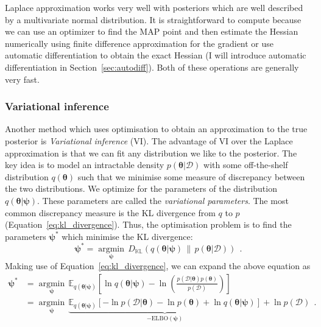 \documentclass[12pt,dvipsnames]{report}
\renewcommand{\vec}[1]{\boldsymbol{\mathbf{#1}}}
\newcommand{\hquad}{~~}
\begin{document}
Laplace approximation works very well with posteriors which are well described
by a multivariate normal distribution. It is straightforward to compute because
we can use an optimizer to find the MAP point and then estimate the Hessian
numerically using finite difference approximation for the gradient or use
automatic differentiation to obtain the exact Hessian (I will introduce automatic
differentiation in Section~\ref{sec:autodiff}). Both of these operations are generally 
very fast.

\subsubsection{Variational inference}
Another method which uses optimisation to obtain an approximation to the true
posterior is \emph{Variational inference} (VI). The advantage of VI over the
Laplace approximation is that we can fit any distribution we like to the
posterior. The key idea is to model an intractable density $p(\vec{\theta}
    \lvert\mathcal{D})$ with some off-the-shelf distribution $q(\vec{\theta})$ such
that we minimise some measure of discrepancy between the two distributions.
We optimize for the parameters of the distribution $q(\vec{\theta}|\vec{\psi})$. 
These parameters are 
called the \emph{variational parameters}. The most
common discrepancy measure is the KL divergence
from $q$ to $p$ (Equation~\ref{eq:kl_divergence}). 
Thus, the optimisation
problem is to find the parameters $\vec{\psi}^*$ which minimise the KL
divergence:
\begin{equation}
    \boldsymbol{\psi}^{*}=\underset{\boldsymbol{\psi}}{\operatorname{argmin}}\,D_{\mathbb{K} \mathbb{L}}(q(\boldsymbol{\theta} \lvert\boldsymbol{\psi})\, \|\, p(\boldsymbol{\theta} \lvert\mathcal{D}))
    \hquad.
    \label{eq:variational_inference}
\end{equation}
Making use of Equation~\ref{eq:kl_divergence}, we can expand the above equation as \citep{murphy_book_2022}
\begin{align}
    \vec{\psi}^* & =\underset{\vec{\psi}}{\operatorname{argmin}}\, \mathbb{E}_{q(\boldsymbol{\theta} \lvert\boldsymbol{\psi})}\left[\ln q(\boldsymbol{\theta} \lvert\boldsymbol{\psi})-\ln \left(\frac{p(\mathcal{D} \lvert\boldsymbol{\theta}) p(\boldsymbol{\theta})}{p(\mathcal{D})}\right)\right]                           \\
                 & =\underset{\vec{\psi}}{\operatorname{argmin}} \,\underbrace{\mathbb{E}_{q(\boldsymbol{\theta} \lvert\boldsymbol{\psi})}[-\ln p(\mathcal{D} \lvert\boldsymbol{\theta})-\ln p(\boldsymbol{\theta})+\ln q(\boldsymbol{\theta} \lvert\boldsymbol{\psi})]}_{-\mathrm{ELBO}(\boldsymbol{\psi})}+\ln p(\mathcal{D})
                 \hquad.
\end{align}
\end{document}
